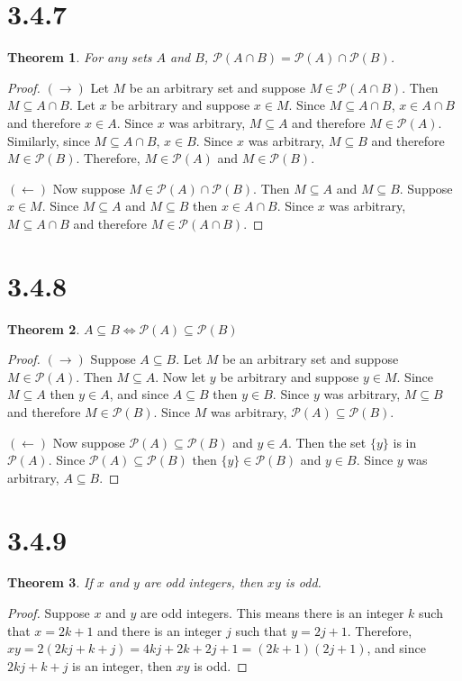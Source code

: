 \documentclass{article}
\newcommand{\pwset}{\mathscr{P}}
\newtheorem*{theorem}{Theorem}  %
\begin{document}
\section*{3.4.7}

\begin{theorem} For any sets $A$ and $B$, $\pwset(A \cap B) = \pwset(A) \cap \pwset(B)$.
\end{theorem}
\begin{proof}
$(\rightarrow)$ Let $M$ be an arbitrary set and suppose $M \in \pwset(A \cap B)$. Then $M \subseteq A \cap B$. Let $x$ be arbitrary and suppose $x \in M$. Since $M \subseteq A \cap B$, $x \in A \cap B$ and therefore $x \in A$. Since $x$ was arbitrary, $M \subseteq A$ and therefore $M \in \pwset(A)$. Similarly, since $M \subseteq A \cap B$, $x \in B$. Since $x$ was arbitrary, $M \subseteq B$ and therefore $M \in \pwset(B)$. Therefore, $M \in \pwset(A)$ and $M \in \pwset(B)$.

$(\leftarrow)$ Now suppose $M \in \pwset(A) \cap \pwset(B)$. Then $M \subseteq A$ and $M \subseteq B$. Suppose $x \in M$. Since $M \subseteq A$ and $M \subseteq B$ then $x \in A \cap B$. Since $x$ was arbitrary, $M \subseteq A \cap B$ and therefore $M \in \pwset(A \cap B)$.
\end{proof}

\section*{3.4.8}
\begin{theorem} $A \subseteq B \iff \pwset(A) \subseteq \pwset(B)$
\end{theorem}
\begin{proof}
$(\rightarrow)$ Suppose $A \subseteq B$. Let $M$ be an arbitrary set and suppose $M \in \pwset(A)$. Then $M \subseteq A$. Now let $y$ be arbitrary and suppose $y \in M$. Since $M \subseteq A$ then $y \in A$, and since $A \subseteq B$ then $y \in B$. Since $y$ was arbitrary, $M \subseteq B$ and therefore $M \in \pwset(B)$. Since $M$ was arbitrary, $\pwset(A) \subseteq \pwset(B)$.

$(\leftarrow)$ Now suppose $\pwset(A) \subseteq \pwset(B)$ and $y \in A$. Then the set $\{y\}$ is in $\pwset(A)$. Since $\pwset(A) \subseteq \pwset(B)$ then $\{y\} \in \pwset(B)$ and $y \in B$. Since $y$ was arbitrary, $A \subseteq B$. 
\end{proof}

\section*{3.4.9}
\begin{theorem} If $x$ and $y$ are odd integers, then $xy$ is odd.
\end{theorem}
\begin{proof}
Suppose $x$ and $y$ are odd integers. This means there is an integer $k$ such that $x = 2k + 1$ and there is an integer $j$ such that $y = 2j + 1$. Therefore, $xy = 2(2kj + k + j) = 4kj + 2k + 2j + 1 = (2k + 1)(2j + 1)$, and since $2kj + k + j$ is an integer, then $xy$ is odd.
\end{proof}
\end{document}
